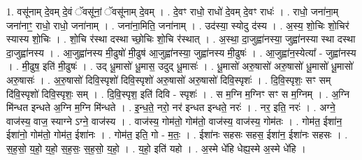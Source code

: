 \documentclass[17pt]{extarticle}
\begin{document}
1. वसू॑नाम् दे॒वम् दे॒वं ॅवसू॑नां॒ ॅवसू॑नाम् दे॒वम् । . दे॒वꣳ राधो॒ राधो॑ दे॒वम् दे॒वꣳ राधः॑ । . राधो॒ जना॑ना॒म् जना॑नाꣳ॒॒ राधो॒ राधो॒ जना॑नाम् । . जना॑ना॒मिति॒ जना॑नाम् । . उद॑स्या॒ स्योदु द॑स्य । . अ॒स्य॒ शो॒चिः शो॒चिर॑ स्यास्य शो॒चिः । . शो॒चि र॑स्था दस्था च्छो॒चिः शो॒चि र॑स्थात् । . अ॒स्था॒ दा॒जुह्वा॑नस्या॒ जुह्वा॑नस्या स्था दस्था दा॒जुह्वा॑नस्य । . आ॒जुह्वा॑नस्य मी॒ढुषो॑ मी॒ढुष॑ आ॒जुह्वा॑नस्या॒ जुह्वा॑नस्य मी॒ढुषः॑ । . आ॒जुह्वा॑न॒स्येत्या᳚ - जुह्वा॑नस्य । . मी॒ढुष॒ इति॑ मी॒ढुषः॑ । . उद् धू॒मासो॑ धू॒मास॒ उदुद् धू॒मासः॑ । . धू॒मासो॑ अरु॒षासो॑ अरु॒षासो॑ धू॒मासो॑ धू॒मासो॑ अरु॒षासः॑ । . अ॒रु॒षासो॑ दिवि॒स्पृशो॑ दिवि॒स्पृशो॑ अरु॒षासो॑ अरु॒षासो॑ दिवि॒स्पृशः॑ । . दि॒वि॒स्पृशः॒ सꣳ सम् दि॑वि॒स्पृशो॑ दिवि॒स्पृशः॒ सम् । . दि॒वि॒स्पृश॒ इति॑ दिवि - स्पृशः॑ । . स म॒ग्नि म॒ग्निꣳ सꣳ स म॒ग्निम् । . अ॒ग्नि मि॑न्धत इन्धते अ॒ग्नि म॒ग्नि मि॑न्धते । . इ॒न्ध॒ते॒ नरो॒ नर॑ इन्धत इन्धते॒ नरः॑ । . नर॒ इति॒ नरः॑ । . अग्ने॒ वाज॑स्य॒ वाज॒ स्याग्ने ऽग्ने॒ वाज॑स्य । . वाज॑स्य॒ गोम॑तो॒ गोम॑तो॒ वाज॑स्य॒ वाज॑स्य॒ गोम॑तः । . गोम॑त॒ ईशा॑न॒ ईशा॑नो॒ गोम॑तो॒ गोम॑त॒ ईशा॑नः । . गोम॑त॒ इति॒ गो - म॒तः॒ । . ईशा॑नः सहसः सहस॒ ईशा॑न॒ ईशा॑नः सहसः । . स॒ह॒सो॒ य॒हो॒ य॒हो॒ स॒ह॒सः॒ स॒ह॒सो॒ य॒हो॒ । . य॒हो॒ इति॑ यहो । . अ॒स्मे धे॑हि धेह्य॒स्मे अ॒स्मे धे॑हि । \newline
\end{document}
